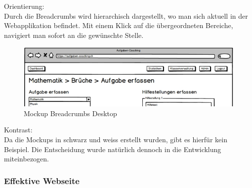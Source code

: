 Orientierung: \\
Durch die Breadcrumbs wird hierarchisch dargestellt, wo man sich aktuell in der Webapplikation befindet. Mit einem Klick auf die übergeordneten Bereiche, navigiert man sofort an die gewünschte Stelle. \\
\begin{minipage}{\textwidth}
	\begin{figure}[H]
	\centering
		\includegraphics[width=\textwidth, keepaspectratio]{images/Mockups/Breadcrumbs_Desktop.png}
		\caption{Mockup Breadcrumbs Desktop}
	\end{figure}
\end{minipage}


Kontrast: \\
Da die Mockups in schwarz und weiss erstellt wurden, gibt es hierfür kein Beispiel. Die Entscheidung wurde natürlich dennoch in die Entwicklung miteinbezogen.



\subsubsection*{Effektive Webseite}

\newpage